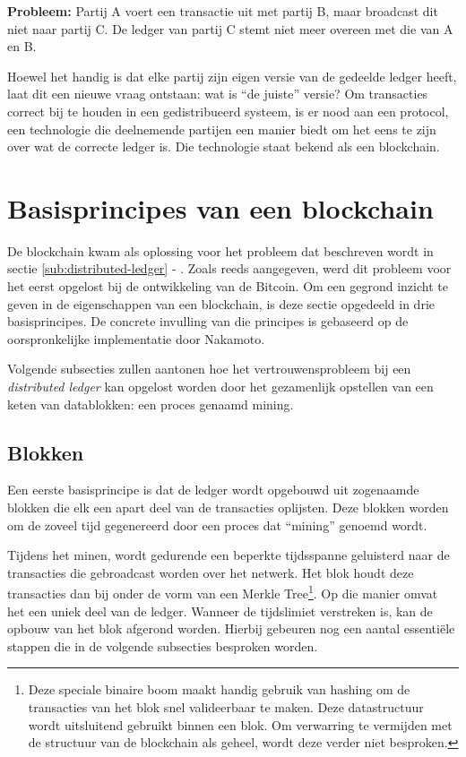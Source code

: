 \textbf{Probleem:} Partij A voert een transactie uit met partij B, maar broadcast dit niet naar partij C. De ledger van partij C stemt niet meer overeen met die van A en B.

Hoewel het handig is dat elke partij zijn eigen versie van de gedeelde ledger heeft, laat dit een nieuwe vraag ontstaan: wat is ``de juiste'' versie? Om transacties correct bij te houden in een gedistribueerd systeem, is er nood aan een protocol, een technologie die deelnemende partijen een manier biedt om het eens te zijn over wat de correcte ledger is. Die technologie staat bekend als een blockchain.


\section{Basisprincipes van een blockchain}
\label{sec:sleutelprincipes-van-een-blokchain}

De blockchain kwam als oplossing voor het probleem dat beschreven wordt in sectie \ref{sub:distributed-ledger} - . Zoals reeds aangegeven, werd dit probleem voor het eerst opgelost bij de ontwikkeling van de Bitcoin. Om een gegrond inzicht te geven in de eigenschappen van een blockchain, is deze sectie opgedeeld in drie basisprincipes. De concrete invulling van die principes is gebaseerd op de oorspronkelijke implementatie door Nakamoto.

Volgende subsecties zullen aantonen hoe het vertrouwensprobleem bij een \textit{distributed ledger} kan opgelost worden door het gezamenlijk opstellen van een keten van datablokken: een proces genaamd mining.


\subsection{Blokken}
\label{sub:blokken}

Een eerste basisprincipe is dat de ledger wordt opgebouwd uit zogenaamde blokken die elk een apart deel van de transacties oplijsten. Deze blokken worden om de zoveel tijd gegenereerd door een proces dat ``mining'' genoemd wordt.

Tijdens het minen, wordt gedurende een beperkte tijdsspanne geluisterd naar de transacties die gebroadcast worden over het netwerk. Het blok houdt deze transacties dan bij onder de vorm van een Merkle Tree\footnote{Deze speciale binaire boom maakt handig gebruik van hashing om de transacties van het blok snel valideerbaar te maken. Deze datastructuur wordt uitsluitend gebruikt binnen een blok. Om verwarring te vermijden met de structuur van de blockchain als geheel, wordt deze verder niet besproken.}. Op die manier omvat het een uniek deel van de ledger. Wanneer de tijdslimiet verstreken is, kan de opbouw van het blok afgerond worden. Hierbij gebeuren nog een aantal essentiële stappen die in de volgende subsecties besproken worden. 


